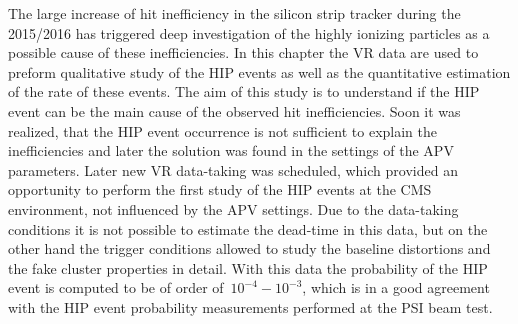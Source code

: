 The large increase of hit inefficiency in the silicon strip tracker during the 2015/2016 has triggered deep investigation of the highly ionizing particles as a possible cause of these inefficiencies. In this chapter the VR data are used to preform qualitative study of the HIP events as well as the quantitative estimation of the rate of these events. The aim of this study is to understand if the HIP event can be the main cause of the observed hit inefficiencies. Soon it was realized, that the HIP event occurrence is not sufficient to explain the inefficiencies and later the solution was found in the settings of the APV parameters. Later new VR data-taking was scheduled, which provided an opportunity to perform the first study of the HIP events at the CMS environment, not influenced by the APV settings. Due to the data-taking conditions it is not possible to estimate the dead-time in this data, but on the other hand the trigger conditions allowed to study the baseline distortions and the fake cluster properties in detail. With this data the probability of the HIP event is computed to be of order of~$10^{-4}-10^{-3}$, which is in a good agreement with the HIP event probability measurements performed at the PSI beam test.

\newpage

